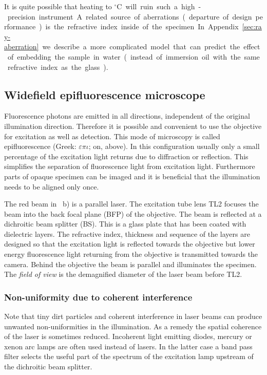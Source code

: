 It is quite possible that heating to \unit[37]{${}^\circ$C} will ruin
such a high-precision instrument. A related source of aberrations
(departure of design performance) is the refractive index inside of
the specimen. In Appendix~\ref{sec:ray-aberration} we describe a more
complicated model that can predict the effect of embedding the sample
in water (instead of immersion oil with the same refractive index as
the glass).

\subsection{Widefield epifluorescence microscope}
Fluorescence photons are emitted in all directions, independent of the
original illumination direction. Therefore it is possible and
convenient to use the objective for excitation as well as
detection. This mode of microscopy is called epifluorescence (Greek:
$\varepsilon\pi\iota$; on, above).  In this configuration usually only
a small percentage of the excitation light returns due to diffraction
or reflection. This simplifies the separation of fluorescence light
from excitation light.  Furthermore parts of opaque specimen can be
imaged and it is beneficial that the illumination needs to be aligned
only once.


The red beam in ~b) is a parallel
laser. The excitation tube lens TL2 focuses the beam into the back
focal plane (BFP) of the objective. The beam is reflected at a
dichroitic beam splitter (BS). This is a glass plate that has been
coated with dielectric layers. The refractive index, thickness and
sequence of the layers are designed so that the excitation light is
reflected towards the objective but lower energy fluorescence light
returning from the objective is transmitted towards the camera. Behind
the objective the beam is parallel and illuminates the specimen. The
\emph{field of view} is the demagnified diameter of the laser beam
before TL2.
\subsubsection*{Non-uniformity due to coherent interference}
Note that tiny dirt particles and coherent interference in laser beams
can produce unwanted non-uniformities in the illumination. As a remedy
the spatial coherence of the laser is sometimes reduced.  Incoherent
light emitting diodes, mercury or xenon arc lamps are often used
instead of lasers. In the latter case a band pass filter selects the
useful part of the spectrum of the excitation lamp upstream of the
dichroitic beam splitter.

